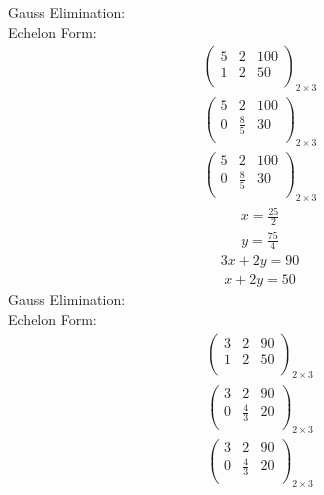 \documentclass{article}
\begin{document}
Gauss Elimination:\\
Echelon Form:\\
\begin{align*}
\left(
\begin{array}{cc|c}
5 & 2 & 100\\
1 & 2 & 50\\
\end{array}
\right)_{2\times 3}
\end{align*}
\begin{align*}
\left(
\begin{array}{cc|c}
5 & 2 & 100\\
0 & \frac{8}{5} & 30\\
\end{array}
\right)_{2\times 3}
\end{align*}
\begin{align*}
\left(
\begin{array}{cc|c}
5 & 2 & 100\\
0 & \frac{8}{5} & 30\\
\end{array}
\right)_{2\times 3}
\end{align*}
\begin{align*}
x=\frac{25}{2}\end{align*}
\begin{align*}
y=\frac{75}{4}\end{align*}
\begin{align*}
3x + 2y=90\end{align*}
\begin{align*}
x + 2y=50\end{align*}
Gauss Elimination:\\
Echelon Form:\\
\begin{align*}
\left(
\begin{array}{cc|c}
3 & 2 & 90\\
1 & 2 & 50\\
\end{array}
\right)_{2\times 3}
\end{align*}
\begin{align*}
\left(
\begin{array}{cc|c}
3 & 2 & 90\\
0 & \frac{4}{3} & 20\\
\end{array}
\right)_{2\times 3}
\end{align*}
\begin{align*}
\left(
\begin{array}{cc|c}
3 & 2 & 90\\
0 & \frac{4}{3} & 20\\
\end{array}
\right)_{2\times 3}
\end{align*}
\end{document}

